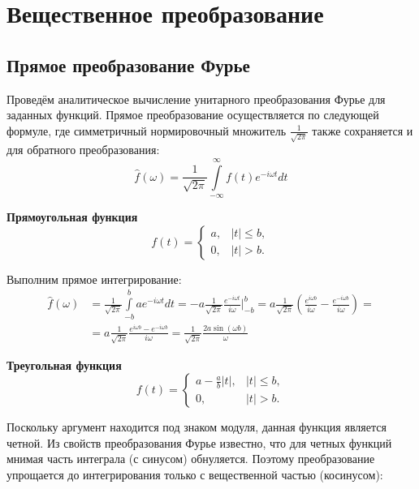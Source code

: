 \documentclass[a4paper,14pt]{extarticle}
\begin{document}
\tableofcontents

\newpage
\section{Вещественное преобразование}

\subsection{Прямое преобразование Фурье}

Проведём аналитическое вычисление унитарного преобразования Фурье для заданных функций. Прямое преобразование осуществляется по следующей формуле, где симметричный нормировочный множитель $\frac{1}{\sqrt{2\pi}}$ также сохраняется и для обратного преобразования:
\begin{equation*}
    \hat{f}(\omega) = \frac{1}{\sqrt{2\pi}}\int\limits_{-\infty}^{\infty}f(t)e^{-i\omega t}dt
\end{equation*}

\textbf{Прямоугольная функция}
\begin{equation*}
f(t) = \begin{cases} 
a, & |t| \le b, \\ 
0, & |t| > b. 
\end{cases}
\end{equation*}

Выполним прямое интегрирование:
\begin{equation*}
\begin{split}
    \hat{f}(\omega) &= \frac{1}{\sqrt{2\pi}}\int\limits_{-b}^{b}ae^{-i\omega t}dt = -a\frac{1}{\sqrt{2\pi}}\frac{e^{-i\omega t}}{i\omega }\Bigg|_{-b}^{b} = a\frac{1}{\sqrt{2\pi}}\left(\frac{e^{i\omega b}}{i\omega } - \frac{e^{-i\omega b}}{i\omega}\right) =\\
    &= a\frac{1}{\sqrt{2\pi}}\frac{e^{i\omega b} - e^{-i\omega b}}{i\omega} = \frac{1}{\sqrt{2\pi}}\frac{2a \sin(\omega b)}{\omega }
\end{split}
\end{equation*}

\textbf{Треугольная функция}
\begin{equation*}
f(t) = \begin{cases} 
a - \frac{a}{b}|t|, & |t| \le b, \\ 
0, & |t| > b. 
\end{cases}
\end{equation*}

Поскольку аргумент находится под знаком модуля, данная функция является четной. Из свойств преобразования Фурье известно, что для четных функций мнимая часть интеграла (с синусом) обнуляется. Поэтому преобразование упрощается до интегрирования только с вещественной частью (косинусом):
\end{document}
